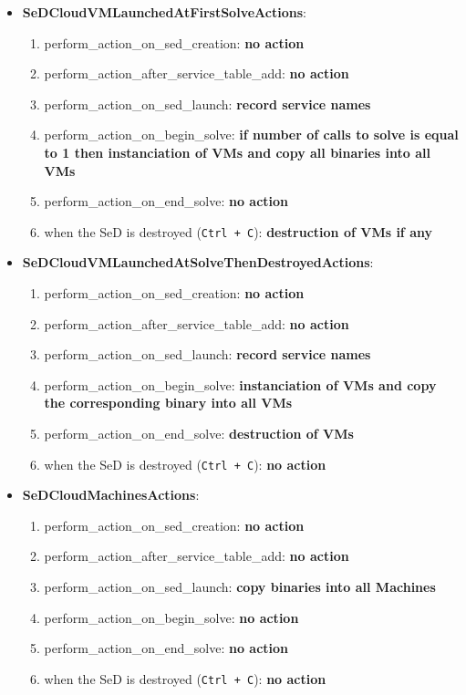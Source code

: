 \begin{itemize}
  \item \textbf{SeDCloudVMLaunchedAtFirstSolveActions}:
    \begin{enumerate}
        \item perform\_action\_on\_sed\_creation: \textbf{no action}
        \item perform\_action\_after\_service\_table\_add: \textbf{no action}
        \item perform\_action\_on\_sed\_launch: \textbf{record service names}
        \item perform\_action\_on\_begin\_solve: \textbf{if number of calls to solve is equal to 1 then instanciation of VMs and copy all binaries into all VMs}
        \item perform\_action\_on\_end\_solve: \textbf{no action}
        \item when the SeD is destroyed (\texttt{Ctrl + C}): \textbf{destruction of VMs if any}
      \end{enumerate}
  \item \textbf{SeDCloudVMLaunchedAtSolveThenDestroyedActions}:
    \begin{enumerate}
        \item perform\_action\_on\_sed\_creation: \textbf{no action}
        \item perform\_action\_after\_service\_table\_add: \textbf{no action}
        \item perform\_action\_on\_sed\_launch: \textbf{record service names}
        \item perform\_action\_on\_begin\_solve: \textbf{instanciation of VMs and copy the corresponding binary into all VMs}
        \item perform\_action\_on\_end\_solve: \textbf{destruction of VMs}
        \item when the SeD is destroyed (\texttt{Ctrl + C}): \textbf{no action}
      \end{enumerate}
  \item \textbf{SeDCloudMachinesActions}:
    \begin{enumerate}
        \item perform\_action\_on\_sed\_creation: \textbf{no action}
        \item perform\_action\_after\_service\_table\_add: \textbf{no action}
        \item perform\_action\_on\_sed\_launch: \textbf{copy binaries into all Machines}
        \item perform\_action\_on\_begin\_solve: \textbf{no action}
        \item perform\_action\_on\_end\_solve: \textbf{no action}
        \item when the SeD is destroyed (\texttt{Ctrl + C}): \textbf{no action}
   \end{enumerate}


\end{itemize}
